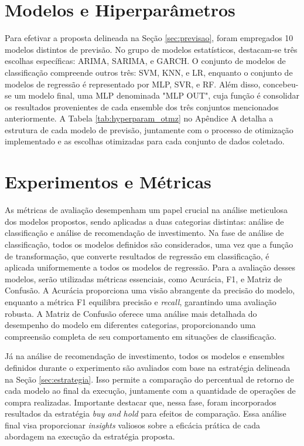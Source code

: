 \section{Modelos e Hiperparâmetros}
\label{sec:modelos_parametros_resultados}
Para efetivar a proposta delineada na Seção \ref{sec:previsao}, foram empregados 10 modelos distintos de previsão. No grupo de modelos estatísticos, destacam-se três escolhas específicas: \ac{ARIMA}, \ac{SARIMA}, e \ac{GARCH}. O conjunto de modelos de classificação compreende outros três: \ac{SVM}, \ac{KNN}, e \ac{LR}, enquanto o conjunto de modelos de regressão é representado por \ac{MLP}, \ac{SVR}, e \ac{RF}. Além disso, concebeu-se um modelo final, uma \ac{MLP} denominada "MLP OUT", cuja função é consolidar os resultados provenientes de cada ensemble dos três conjuntos mencionados anteriormente.
A Tabela \ref{tab:hyperparam_otmz} no Apêndice A detalha a estrutura de cada modelo de previsão, juntamente com o processo de otimização implementado e as escolhas otimizadas para cada conjunto de dados coletado. 

	
\section{Experimentos e Métricas}
\label{sec:experimentos _metricas}
As métricas de avaliação desempenham um papel crucial na análise meticulosa dos modelos propostos, sendo aplicadas a duas categorias distintas: análise de classificação e análise de recomendação de investimento.
Na fase de análise de classificação, todos os modelos definidos são considerados, uma vez que a função de transformação, que converte resultados de regressão em classificação, é aplicada uniformemente a todos os modelos de regressão. Para a avaliação desses modelos, serão utilizadas métricas essenciais, como Acurácia, \ac{F1}, e Matriz de Confusão. A Acurácia proporciona uma visão abrangente da precisão do modelo, enquanto a métrica \ac{F1} equilibra precisão e \textit{recall}, garantindo uma avaliação robusta. A Matriz de Confusão oferece uma análise mais detalhada do desempenho do modelo em diferentes categorias, proporcionando uma compreensão completa de seu comportamento em situações de classificação.

Já na análise de recomendação de investimento, todos os modelos e ensembles definidos durante o experimento são avaliados com base na estratégia delineada na Seção \ref{sec:estrategia}. Isso permite a comparação do percentual de retorno de cada modelo ao final da execução, juntamente com a quantidade de operações de compra realizadas. Importante destacar que, nessa fase, foram incorporados resultados da estratégia \textit{buy and hold} para efeitos de comparação. Essa análise final visa proporcionar \textit{insights} valiosos sobre a eficácia prática de cada abordagem na execução da estratégia proposta.


